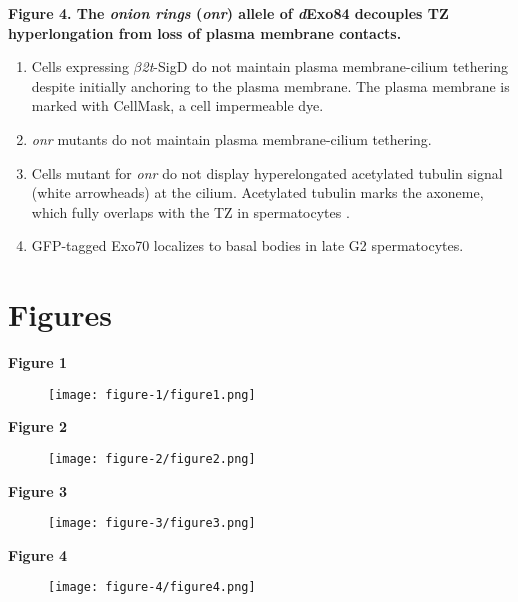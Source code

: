 \documentclass[12pt, twoside, letterpaper]{article}
\newcommand{\sigd}{$\beta$\textit{2t}-SigD}
\begin{document}
\begin{doublespacing}
\begin{linenumbers}
    \textbf{Figure 4. The \textit{onion rings} (\textit{onr}) allele of \textit{d}Exo84 decouples TZ hyperlongation from loss of plasma membrane contacts.}
    \begin{enumerate}[label={(\Alph*)}, nolistsep]
    \item Cells expressing \sigd{} do not maintain plasma membrane-cilium tethering despite initially anchoring to the plasma membrane.
      The plasma membrane is marked with CellMask, a cell impermeable dye.
    \item \textit{onr} mutants do not maintain plasma membrane-cilium tethering.
    \item Cells mutant for \textit{onr} do not display hyperelongated acetylated tubulin signal (white arrowheads) at the cilium.
      Acetylated tubulin marks the axoneme, which fully overlaps with the TZ in spermatocytes \citep{pratt2016drosophila}.
    \item GFP-tagged Exo70 localizes to basal bodies in late G2 spermatocytes.
    \end{enumerate}
    
  \end{linenumbers}
\end{doublespacing}



\newpage

\section{Figures}

\textbf{Figure 1}
\begin{figure}[ht]
  \texttt{[image: figure-1/figure1.png]}
\end{figure}
\newpage

\textbf{Figure 2}
\begin{figure}[ht]
  \texttt{[image: figure-2/figure2.png]}
\end{figure}
\newpage

\textbf{Figure 3}
\begin{figure}[ht]
  \texttt{[image: figure-3/figure3.png]}
\end{figure}
\newpage

\textbf{Figure 4}
\begin{figure}[ht]
  \texttt{[image: figure-4/figure4.png]}
\end{figure}
\newpage
\end{document}
